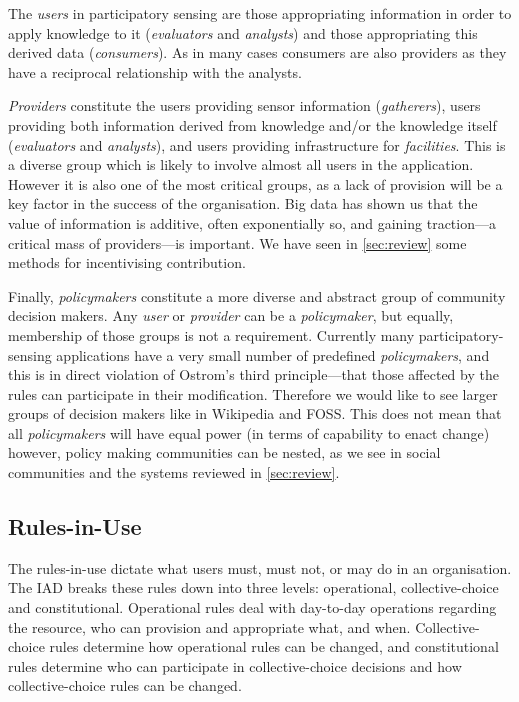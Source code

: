 The \emph{users} in participatory sensing are those appropriating information in order to apply knowledge to it (\emph{evaluators} and \emph{analysts}) and those appropriating this derived data (\emph{consumers}). As in many cases consumers are also providers as they have a reciprocal relationship with the analysts.

\emph{Providers} constitute the users providing sensor information (\emph{gatherers}), users providing both information derived from knowledge and/or the knowledge itself (\emph{evaluators} and \emph{analysts}), and users providing infrastructure for \emph{facilities}. This is a diverse group which is likely to involve almost all users in the application. However it is also one of the most critical groups, as a lack of provision will be a key factor in the success of the organisation. Big data has shown us that the value of information is additive, often exponentially so, and gaining traction---a critical mass of providers---is important. 
We have seen in \autoref{sec:review} some methods for incentivising contribution.

Finally, \emph{policymakers} constitute a more diverse and abstract group of community decision makers. Any \emph{user} or \emph{provider} can be a \emph{policymaker}, but equally, membership of those groups is not a requirement. 
Currently many participatory-sensing applications have a very small number of predefined \emph{policymakers}, and this is in direct violation of Ostrom's third principle---that those affected by the rules can participate in their modification. 
Therefore we would like to see larger groups of decision makers like in Wikipedia and \ac{FOSS}. This does not mean that all \emph{policymakers} will have equal power (in terms of capability to enact change) however, policy making communities can be nested, as we see in social communities and the systems reviewed in \autoref{sec:review}.


\subsection{Rules-in-Use}

The rules-in-use dictate what users must, must not, or may do in an organisation. The \ac{IAD} breaks these rules down into three levels: operational, collective-choice and constitutional. Operational rules deal with day-to-day operations regarding the resource, who can provision and appropriate what, and when. 
Collective-choice rules determine how operational rules can be changed, and constitutional rules determine who can participate in collective-choice decisions and how collective-choice rules can be changed.

